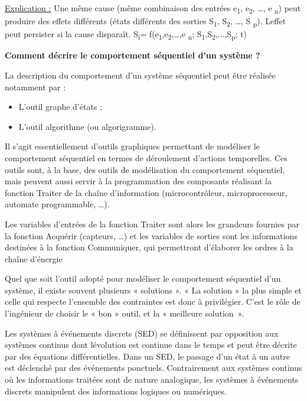 \ul{Explication :} Une même cause (même combinaison des entrées e\textsubscript{1}, e\textsubscript{2}, \ldots, e \textsubscript{n}) peut produire des effets différents (états différents des sorties S\textsubscript{1}, S\textsubscript{2}, \ldots, S \textsubscript{p}). L\textquotesingle effet peut persister si la cause disparaît. S\textsubscript{i}= f(e\textsubscript{1},e\textsubscript{2},\ldots,e \textsubscript{n}; S\textsubscript{1},S\textsubscript{2},...,S\textsubscript{p}; t)

\textbf{Comment décrire le comportement séquentiel d'un système ?}

La description du comportement d'un système séquentiel peut être réalisée notamment par :

\begin{itemize}
\item
  L'outil graphe d'états ;
\item
  L'outil algorithme (ou algorigramme).
\end{itemize}

Il s'agit essentiellement d'outils graphiques permettant de modéliser le comportement séquentiel en termes de déroulement d'actions temporelles. Ces outils sont, à la base, des outils de modélisation du comportement séquentiel, mais peuvent aussi servir à la programmation des composants réalisant la fonction Traiter de la chaîne d'information (microcontrôleur, microprocesseur, automate programmable, \ldots).

Les variables d'entrées de la fonction Traiter sont alors les grandeurs fournies par la fonction Acquérir (capteurs, \ldots) et les variables de sorties sont les informations destinées à la fonction Communiquer, qui permettront d'élaborer les ordres à la chaîne d'énergie

Quel que soit l'outil adopté pour modéliser le comportement séquentiel d'un système, il existe souvent plusieurs « solutions ». « La solution » la plus simple et celle qui respecte l'ensemble des contraintes est donc à privilégier. C'est le rôle de l'ingénieur de choisir le « bon » outil, et la « meilleure solution~».

Les systèmes à événements discrets (SED) se définissent par opposition aux systèmes continus dont l\textquotesingle évolution est continue dans le temps et peut être décrite par des équations différentielles. Dans un SED, le passage d'un état à un autre est déclenché par des événements ponctuels. Contrairement aux systèmes continus où les informations traitées sont de nature analogique, les systèmes à événements discrets manipulent des informations logiques ou numériques.

